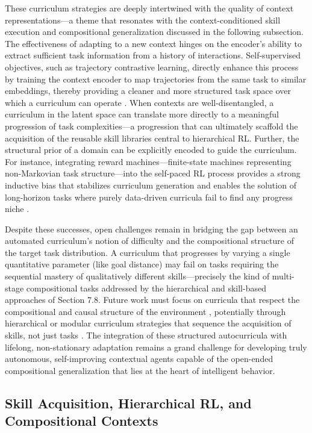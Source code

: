 \documentclass[11pt]{article}
\begin{document}
These curriculum strategies are deeply intertwined with the quality of context representations---a theme that resonates with the context-conditioned skill execution and compositional generalization discussed in the following subsection. The effectiveness of adapting to a new context hinges on the encoder's ability to extract sufficient task information from a history of interactions. Self-supervised objectives, such as trajectory contrastive learning, directly enhance this process by training the context encoder to map trajectories from the same task to similar embeddings, thereby providing a cleaner and more structured task space over which a curriculum can operate \cite{ref318,ref310}. When contexts are well-disentangled, a curriculum in the latent space can translate more directly to a meaningful progression of task complexities---a progression that can ultimately scaffold the acquisition of the reusable skill libraries central to hierarchical RL. Further, the structural prior of a domain can be explicitly encoded to guide the curriculum. For instance, integrating reward machines---finite-state machines representing non-Markovian task structure---into the self-paced RL process provides a strong inductive bias that stabilizes curriculum generation and enables the solution of long-horizon tasks where purely data-driven curricula fail to find any progress niche \cite{ref380}.

Despite these successes, open challenges remain in bridging the gap between an automated curriculum's notion of difficulty and the compositional structure of the target task distribution. A curriculum that progresses by varying a single quantitative parameter (like goal distance) may fail on tasks requiring the sequential mastery of qualitatively different skills---precisely the kind of multi-stage compositional tasks addressed by the hierarchical and skill-based approaches of Section 7.8. Future work must focus on curricula that respect the compositional and causal structure of the environment \cite{ref381}, potentially through hierarchical or modular curriculum strategies that sequence the acquisition of skills, not just tasks \cite{ref321}. The integration of these structured autocurricula with lifelong, non-stationary adaptation remains a grand challenge for developing truly autonomous, self-improving contextual agents capable of the open-ended compositional generalization that lies at the heart of intelligent behavior.

\subsection{Skill Acquisition, Hierarchical RL, and Compositional Contexts}
\end{document}
